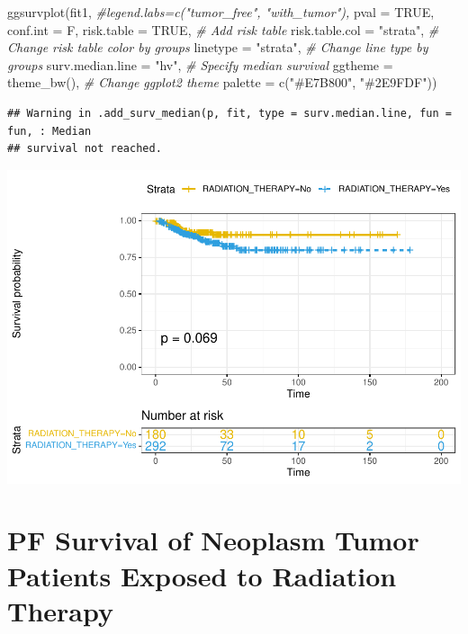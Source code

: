 \documentclass[
  11pt,
]{article}
\newenvironment{Shaded}{\begin{snugshade}}{\end{snugshade}}
\newcommand{\AttributeTok}[1]{\textcolor[rgb]{0.77,0.63,0.00}{#1}}
\newcommand{\CommentTok}[1]{\textcolor[rgb]{0.56,0.35,0.01}{\textit{#1}}}
\newcommand{\ConstantTok}[1]{\textcolor[rgb]{0.00,0.00,0.00}{#1}}
\newcommand{\FunctionTok}[1]{\textcolor[rgb]{0.00,0.00,0.00}{#1}}
\newcommand{\NormalTok}[1]{#1}
\newcommand{\StringTok}[1]{\textcolor[rgb]{0.31,0.60,0.02}{#1}}
\begin{document}
\newpage

\begin{Shaded}
\begin{Highlighting}[]
\FunctionTok{ggsurvplot}\NormalTok{(fit1,}
          \CommentTok{\#legend.labs=c("tumor\_free", "with\_tumor"),}
          \AttributeTok{pval =} \ConstantTok{TRUE}\NormalTok{, }\AttributeTok{conf.int =}\NormalTok{ F,}
          \AttributeTok{risk.table =} \ConstantTok{TRUE}\NormalTok{, }\CommentTok{\# Add risk table}
          \AttributeTok{risk.table.col =} \StringTok{"strata"}\NormalTok{, }\CommentTok{\# Change risk table color by groups}
          \AttributeTok{linetype =} \StringTok{"strata"}\NormalTok{, }\CommentTok{\# Change line type by groups}
          \AttributeTok{surv.median.line =} \StringTok{"hv"}\NormalTok{, }\CommentTok{\# Specify median survival}
          \AttributeTok{ggtheme =} \FunctionTok{theme\_bw}\NormalTok{(), }\CommentTok{\# Change ggplot2 theme}
          \AttributeTok{palette =} \FunctionTok{c}\NormalTok{(}\StringTok{"\#E7B800"}\NormalTok{, }\StringTok{"\#2E9FDF"}\NormalTok{))}
\end{Highlighting}
\end{Shaded}

\begin{verbatim}
## Warning in .add_surv_median(p, fit, type = surv.median.line, fun = fun, : Median
## survival not reached.
\end{verbatim}

\includegraphics{thyroid_1_files/figure-latex/unnamed-chunk-6-1.pdf}

\newpage
\section{PF Survival of Neoplasm Tumor Patients Exposed to Radiation Therapy}
\end{document}
